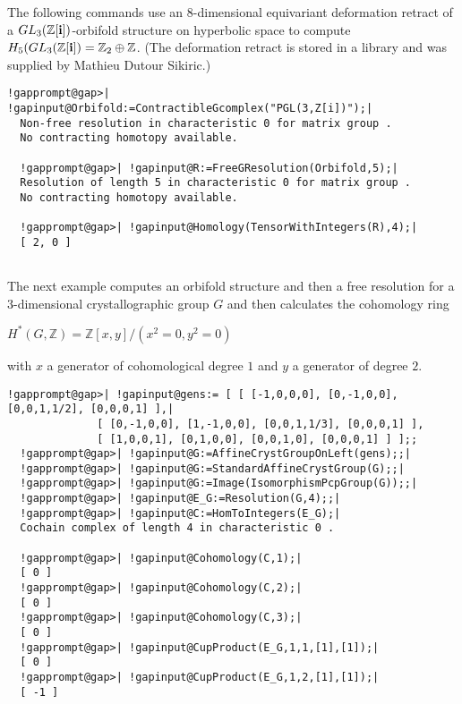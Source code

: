 \documentclass[a4paper,11pt]{report}
\begin{document}
{{ The following commands use an $8$-dimensional equivariant deformation retract of a $GL_3(\mathbb Z[{\bf i}])$-orbifold structure on hyperbolic space to compute $H_5(GL_3({\mathbb Z}[{\bf i}]) = \mathbb Z_2\oplus \mathbb Z$. (The deformation retract is stored in a library and was supplied by Mathieu
Dutour Sikiric.) 
\begin{Verbatim}[commandchars=!@|,fontsize=\small,frame=single,label=Example]
  !gapprompt@gap>| !gapinput@Orbifold:=ContractibleGcomplex("PGL(3,Z[i])");|
  Non-free resolution in characteristic 0 for matrix group . 
  No contracting homotopy available. 
  
  !gapprompt@gap>| !gapinput@R:=FreeGResolution(Orbifold,5);|
  Resolution of length 5 in characteristic 0 for matrix group . 
  No contracting homotopy available. 
  
  !gapprompt@gap>| !gapinput@Homology(TensorWithIntegers(R),4);|
  [ 2, 0 ]
  
\end{Verbatim}
 The next example computes an orbifold structure and then a free resolution for
a $3$-dimensional crystallographic group $G$ and then calculates the cohomology ring 

$H^\ast(G,\mathbb Z) = \mathbb Z[x,y]/(x^2=0, y^2=0)$ 

with $x$ a generator of cohomological degree $1$ and $y$ a generator of degree $2$. 
\begin{Verbatim}[commandchars=!@|,fontsize=\small,frame=single,label=Example]
  !gapprompt@gap>| !gapinput@gens:= [ [ [-1,0,0,0], [0,-1,0,0], [0,0,1,1/2], [0,0,0,1] ],|
              [ [0,-1,0,0], [1,-1,0,0], [0,0,1,1/3], [0,0,0,1] ],
              [ [1,0,0,1], [0,1,0,0], [0,0,1,0], [0,0,0,1] ] ];;
  !gapprompt@gap>| !gapinput@G:=AffineCrystGroupOnLeft(gens);;|
  !gapprompt@gap>| !gapinput@G:=StandardAffineCrystGroup(G);;|
  !gapprompt@gap>| !gapinput@G:=Image(IsomorphismPcpGroup(G));;|
  !gapprompt@gap>| !gapinput@E_G:=Resolution(G,4);;|
  !gapprompt@gap>| !gapinput@C:=HomToIntegers(E_G);|
  Cochain complex of length 4 in characteristic 0 . 
  
  !gapprompt@gap>| !gapinput@Cohomology(C,1);|
  [ 0 ]
  !gapprompt@gap>| !gapinput@Cohomology(C,2);|
  [ 0 ]
  !gapprompt@gap>| !gapinput@Cohomology(C,3);|
  [ 0 ]
  !gapprompt@gap>| !gapinput@CupProduct(E_G,1,1,[1],[1]);|
  [ 0 ]
  !gapprompt@gap>| !gapinput@CupProduct(E_G,1,2,[1],[1]);|
  [ -1 ]
  
\end{Verbatim}
 }

 }
\end{document}
